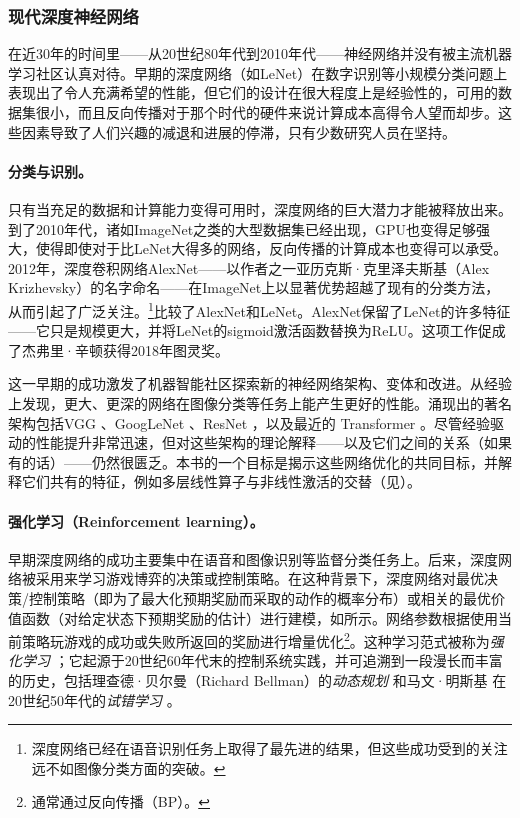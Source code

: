 \documentclass[../../book-main_zh.tex]{subfiles}
\begin{document}
\subsubsection{现代深度神经网络}
在近30年的时间里——从20世纪80年代到2010年代——神经网络并没有被主流机器学习社区认真对待。早期的深度网络（如LeNet）在数字识别等小规模分类问题上表现出了令人充满希望的性能，但它们的设计在很大程度上是经验性的，可用的数据集很小，而且反向传播对于那个时代的硬件来说计算成本高得令人望而却步。这些因素导致了人们兴趣的减退和进展的停滞，只有少数研究人员在坚持。

\paragraph{分类与识别。}
只有当充足的数据和计算能力变得可用时，深度网络的巨大潜力才能被释放出来。到了2010年代，诸如ImageNet之类的大型数据集已经出现，GPU也变得足够强大，使得即使对于比LeNet大得多的网络，反向传播的计算成本也变得可以承受。2012年，深度卷积网络AlexNet——以作者之一亚历克斯·克里泽夫斯基（Alex
Krizhevsky）的名字命名\cite{krizhevsky2012imagenet}——在ImageNet上以显著优势超越了现有的分类方法，从而引起了广泛关注。\footnote{深度网络已经在语音识别任务上取得了最先进的结果，但这些成功受到的关注远不如图像分类方面的突破。}比较了AlexNet和LeNet。AlexNet保留了LeNet的许多特征——它只是规模更大，并将LeNet的sigmoid激活函数替换为ReLU。这项工作促成了杰弗里·辛顿获得2018年图灵奖。

这一早期的成功激发了机器智能社区探索新的神经网络架构、变体和改进。从经验上发现，更大、更深的网络在图像分类等任务上能产生更好的性能。涌现出的著名架构包括VGG
\cite{Simonyan15}、GoogLeNet \cite{Szegedy2014GoingDW}、ResNet
\cite{He2016-lc}，以及最近的 Transformer
\cite{vaswani2017attention}。尽管经验驱动的性能提升非常迅速，但对这些架构的理论解释——以及它们之间的关系（如果有的话）——仍然很匮乏。本书的一个目标是揭示这些网络优化的共同目标，并解释它们共有的特征，例如多层线性算子与非线性激活的交替（见）。

\paragraph{强化学习（Reinforcement learning）。}
早期深度网络的成功主要集中在语音和图像识别等监督分类任务上。后来，深度网络被采用来学习游戏博弈的决策或控制策略。在这种背景下，深度网络对最优决策/控制策略（即为了最大化预期奖励而采取的动作的概率分布）或相关的最优价值函数（对给定状态下预期奖励的估计）进行建模，如所示。网络参数根据使用当前策略玩游戏的成功或失败所返回的奖励进行增量优化\footnote{通常通过反向传播（BP）。}。这种学习范式被称为\textit{强化学习}
\cite{Sutton-Barto}；它起源于20世纪60年代末的控制系统实践\cite{Waltz1965AHA,Mendel1970ReinforcementlearningCA}，并可追溯到一段漫长而丰富的历史，包括理查德·贝尔曼（Richard
Bellman）的\textit{动态规划} \cite{Bellman-DP}和马文·明斯基
在20世纪50年代的\textit{试错学习} \cite{Minsky-1954}。
\end{document}
